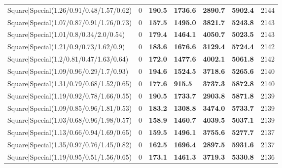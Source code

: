 \begin{tabular}{lrllllr}
 Square|Special(1.26/0.91/0.48/1.57/0.62)                      &             0   & \textbf{190.5} & \textbf{1736.6} & \textbf{2890.7} & \textbf{5902.4} &         2144 \\
 Square|Special(1.07/0.87/0.91/1.76/0.73)                      &             0   & \textbf{157.5} & \textbf{1495.0} & \textbf{3821.7} & \textbf{5243.8} &         2143 \\
 Square|Special(1.01/0.8/0.34/2.0/0.54)                        &             0   & \textbf{179.4} & \textbf{1464.1} & \textbf{4050.7} & \textbf{5023.5} &         2143 \\
 Square|Special(1.21/0.9/0.73/1.62/0.9)                        &             0   & \textbf{183.6} & \textbf{1676.6} & \textbf{3129.4} & \textbf{5724.4} &         2142 \\
 Square|Special(1.2/0.81/0.47/1.63/0.64)                       &             0   & \textbf{172.0} & \textbf{1477.6} & \textbf{4002.1} & \textbf{5061.8} &         2142 \\
 Square|Special(1.09/0.96/0.29/1.7/0.93)                       &             0   & \textbf{194.6} & \textbf{1524.5} & \textbf{3718.6} & \textbf{5265.6} &         2140 \\
 Square|Special(1.31/0.79/0.68/1.52/0.65)                      &             0   & \textbf{177.6} & \textbf{915.5}  & \textbf{3737.3} & \textbf{5872.8} &         2140 \\
 Square|Special(1.19/0.92/0.78/1.66/0.55)                      &             0   & \textbf{190.5} & \textbf{1733.7} & \textbf{2903.8} & \textbf{5871.8} &         2139 \\
 Square|Special(1.09/0.85/0.96/1.81/0.53)                      &             0   & \textbf{183.2} & \textbf{1308.8} & \textbf{3474.0} & \textbf{5733.7} &         2139 \\
 Square|Special(1.03/0.68/0.96/1.98/0.57)                      &             0   & \textbf{158.9} & \textbf{1460.7} & \textbf{4039.5} & \textbf{5037.1} &         2139 \\
 Square|Special(1.13/0.66/0.94/1.69/0.65)                      &             0   & \textbf{159.5} & \textbf{1496.1} & \textbf{3755.6} & \textbf{5277.7} &         2137 \\
 Square|Special(1.35/0.97/0.76/1.45/0.82)                      &             0   & \textbf{162.5} & \textbf{1696.4} & \textbf{2897.5} & \textbf{5931.6} &         2137 \\
 Square|Special(1.19/0.95/0.51/1.56/0.65)                      &             0   & \textbf{173.1} & \textbf{1461.3} & \textbf{3719.3} & \textbf{5330.8} &         2136 \\

\end{tabular}
